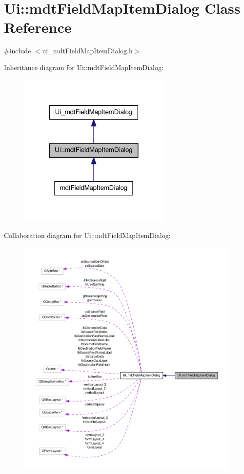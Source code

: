\hypertarget{class_ui_1_1mdt_field_map_item_dialog}{\section{Ui\-:\-:mdt\-Field\-Map\-Item\-Dialog Class Reference}
\label{class_ui_1_1mdt_field_map_item_dialog}
}


{\ttfamily \#include $<$ui\-\_\-mdt\-Field\-Map\-Item\-Dialog.\-h$>$}



Inheritance diagram for Ui\-:\-:mdt\-Field\-Map\-Item\-Dialog\-:
\nopagebreak
\begin{figure}[H]
\begin{center}
\leavevmode
\includegraphics[width=216pt]{class_ui_1_1mdt_field_map_item_dialog__inherit__graph}
\end{center}
\end{figure}


Collaboration diagram for Ui\-:\-:mdt\-Field\-Map\-Item\-Dialog\-:
\nopagebreak
\begin{figure}[H]
\begin{center}
\leavevmode
\includegraphics[width=350pt]{class_ui_1_1mdt_field_map_item_dialog__coll__graph}
\end{center}
\end{figure}
